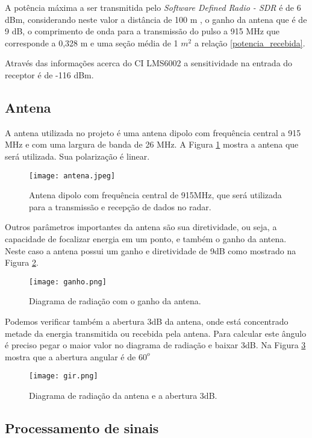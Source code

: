 A potência máxima a ser transmitida pelo \emph{Software Defined Radio - SDR} é de 6 dBm, considerando neste valor a distância de 100 m , o ganho da antena que é de 9 dB, o comprimento de onda para a transmissão do pulso a 915 MHz que corresponde a 0,328 m e uma seção média de 1 $m^2$ a relação \ref{potencia_recebida}.

Através das informações acerca do CI LMS6002 a sensitividade na entrada do receptor é de -116 dBm.

\subsection{Antena}
A antena utilizada no projeto é uma antena dipolo com frequência central a 915 MHz e com uma largura de banda de 26 MHz. A Figura \ref{antena} mostra a antena que será utilizada. Sua polarização é linear. 

\begin{figure}[H]
    \centering
   \texttt{[image: antena.jpeg]}
   \caption{Antena dipolo com frequência central de 915MHz, que será utilizada para a transmissão e recepção de dados no radar.}
   \label{antena}
    \end{figure}

Outros parâmetros importantes da antena são sua diretividade, ou seja, a capacidade de focalizar energia em um ponto, e também o ganho da antena. Neste caso a antena possui um ganho e diretividade de 9dB como mostrado na Figura \ref{ganho}.

\begin{figure}[H]
    \centering
   \texttt{[image: ganho.png]}
   \caption{Diagrama de radiação com o ganho da antena.}
   \label{ganho}
    \end{figure}

Podemos verificar também a abertura 3dB da antena, onde está concentrado metade da energia transmitida ou recebida pela antena.  Para calcular este ângulo é preciso pegar o maior valor no diagrama de radiação e baixar 3dB. Na Figura \ref{dr} mostra que a abertura angular é de $60^o$

\begin{figure}[t]
    \centering
   \texttt{[image: gir.png]}
   \caption{Diagrama de radiação da antena e a
abertura 3dB.}
   \label{dr}
    \end{figure}


\subsection{Processamento de sinais}
 
